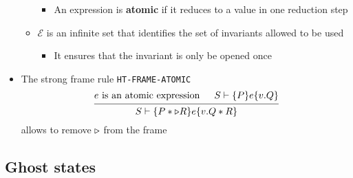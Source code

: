 \begin{itemize}
\begin{itemize}
    \begin{itemize}
    	\item An expression is \textbf{atomic} if it reduces to a value in one reduction step
    \end{itemize}
    \item $\mathcal E$ is an infinite set that identifies the set of invariants allowed to be used
    \begin{itemize}
    	\item It ensures that the invariant is only be opened once
    \end{itemize}
  \end{itemize}
  \item The strong frame rule \texttt{HT-FRAME-ATOMIC}
  \[
  \begin{prooftree} 
    \hypo{e \text{ is an atomic expression}}
    \hypo{S \vdash \{P\} e \{v.Q\}}
    \infer2{S \vdash \{P * \later R\} e \{v.Q * R\}} 
  \end{prooftree}
  \]
  allows to remove $\triangleright$ from the frame
\end{itemize}

\subsection{Ghost states}
